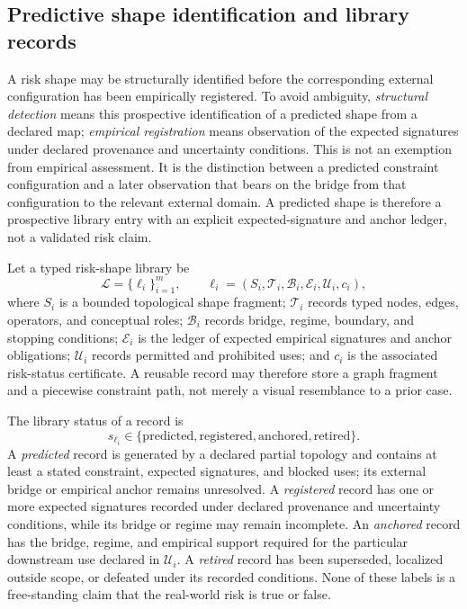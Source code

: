 \documentclass[10pt]{article}
\begin{document}
\subsection{Predictive shape identification and library records}
\label{sec:predictive-library-supp}

A risk shape may be structurally identified before the corresponding external configuration has been empirically registered. To avoid ambiguity, \emph{structural detection} means this prospective identification of a predicted shape from a declared map; \emph{empirical registration} means observation of the expected signatures under declared provenance and uncertainty conditions. This is not an exemption from empirical assessment. It is the distinction between a predicted constraint configuration and a later observation that bears on the bridge from that configuration to the relevant external domain. A predicted shape is therefore a prospective library entry with an explicit expected-signature and anchor ledger, not a validated risk claim.

Let a typed risk-shape library be
\begin{equation}
\mathcal{L}=\{\ell_i\}_{i=1}^{m},
\qquad
\ell_i=(S_i,\mathcal{T}_i,\mathcal{B}_i,\mathcal{E}_i,\mathcal{U}_i,c_i),
\label{eq:shape-library-supp}
\end{equation}
where $S_i$ is a bounded topological shape fragment; $\mathcal{T}_i$ records typed nodes, edges, operators, and conceptual roles; $\mathcal{B}_i$ records bridge, regime, boundary, and stopping conditions; $\mathcal{E}_i$ is the ledger of expected empirical signatures and anchor obligations; $\mathcal{U}_i$ records permitted and prohibited uses; and $c_i$ is the associated risk-status certificate. A reusable record may therefore store a graph fragment and a piecewise constraint path, not merely a visual resemblance to a prior case.

The library status of a record is
\begin{equation}
s_{\ell_i}\in\{\mathrm{predicted},\mathrm{registered},\mathrm{anchored},\mathrm{retired}\}.
\label{eq:shape-library-status-supp}
\end{equation}
A \emph{predicted} record is generated by a declared partial topology and contains at least a stated constraint, expected signatures, and blocked uses; its external bridge or empirical anchor remains unresolved. A \emph{registered} record has one or more expected signatures recorded under declared provenance and uncertainty conditions, while its bridge or regime may remain incomplete. An \emph{anchored} record has the bridge, regime, and empirical support required for the particular downstream use declared in $\mathcal{U}_i$. A \emph{retired} record has been superseded, localized outside scope, or defeated under its recorded conditions. None of these labels is a free-standing claim that the real-world risk is true or false.
\end{document}
